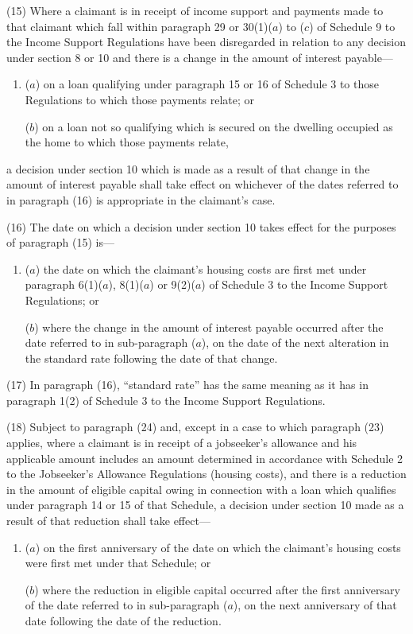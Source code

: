 \documentclass[12pt,a4paper]{article}
\begin{document}
(15) Where a claimant is in receipt of income support and payments made to that claimant which fall within paragraph 29 or 30(1)($a$) to ($c$) of Schedule 9 to the Income Support Regulations have been disregarded in relation to any decision under section 8 or 10 and there is a change in the amount of interest payable—
\begin{enumerate}\item[]
($a$) on a loan qualifying under paragraph 15 or 16 of Schedule 3 to those Regulations to which those payments relate; or

($b$) on a loan not so qualifying which is secured on the dwelling occupied as the home to which those payments relate,
\end{enumerate}
a decision under section 10 which is made as a result of that change in the amount of interest payable shall take effect on whichever of the dates referred to in paragraph (16) is appropriate in the claimant’s case.

(16) The date on which a decision under section 10 takes effect for the purposes of paragraph (15) is—
\begin{enumerate}\item[]
($a$) the date on which the claimant’s housing costs are first met under paragraph 6(1)($a$), 8(1)($a$) or 9(2)($a$) of Schedule 3 to the Income Support Regulations; or

($b$) where the change in the amount of interest payable occurred after the date referred to in sub-paragraph ($a$), on the date of the next alteration in the standard rate following the date of that change.
\end{enumerate}

(17) In paragraph (16), “standard rate” has the same meaning as it has in paragraph 1(2) of Schedule 3 to the Income Support Regulations.

(18) Subject to paragraph (24) and, except in a case to which paragraph (23) applies, where a claimant is in receipt of a jobseeker’s allowance and his applicable amount includes an amount determined in accordance with Schedule 2 to the Jobseeker’s Allowance Regulations (housing costs), and there is a reduction in the amount of eligible capital owing in connection with a loan which qualifies under paragraph 14 or 15 of that Schedule, a decision under section 10 made as a result of that reduction shall take effect—
\begin{enumerate}\item[]
($a$) on the first anniversary of the date on which the claimant’s housing costs were first met under that Schedule; or

($b$) where the reduction in eligible capital occurred after the first anniversary of the date referred to in sub-paragraph ($a$), on the next anniversary of that date following the date of the reduction.
\end{enumerate}
\end{document}
